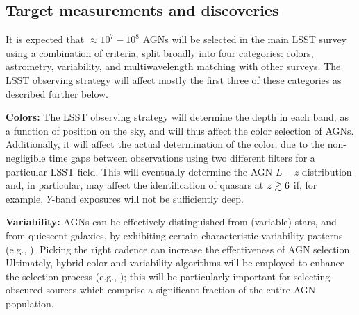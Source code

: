 
\subsection{Target measurements and discoveries}
\label{sec:\secname:targets}




It is expected that $\approx 10^7 - 10^8$ AGNs will be selected in the
main LSST survey using a combination of criteria, split broadly into
four categories: colors, astrometry, variability, and multiwavelength
matching with other surveys. The LSST observing strategy will affect
mostly the first three of these categories as described further below.

{\bf Colors:} The LSST observing strategy will determine the depth in
each band, as a function of position on the sky, and will thus affect
the color selection of AGNs. Additionally, it will affect the actual
determination of the color, due to the non-negligible time gaps between
observations using two different filters for a particular LSST field.
This will eventually determine the AGN $L-z$ distribution and, in
particular, may affect the identification of quasars at $z\gtrsim 6$ if,
for example, $Y$-band exposures will not be sufficiently deep.

{\bf Variability:} AGNs can be effectively distinguished from (variable)
stars, and from quiescent galaxies, by exhibiting certain characteristic
variability patterns (e.g., \citet{ButlerandBloom2011}). Picking the
right cadence can increase the effectiveness of AGN selection. Ultimately,
hybrid color and variability algorithms will be employed to enhance
the selection process (e.g., \citet{PetersEtal2015}); this will be
particularly important for selecting obscured sources which comprise a
significant fraction of the entire AGN population.

